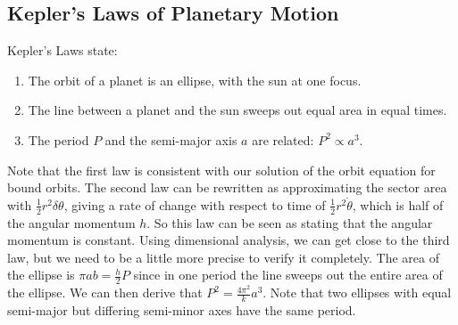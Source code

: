 \subsection{Kepler's Laws of Planetary Motion}
Kepler's Laws state:
\begin{enumerate}
	\item The orbit of a planet is an ellipse, with the sun at one focus.
	\item The line between a planet and the sun sweeps out equal area in equal times.
	\item The period $P$ and the semi-major axis $a$ are related: $P^2 \propto a^3$.
\end{enumerate}
Note that the first law is consistent with our solution of the orbit equation for bound orbits. The second law can be rewritten as approximating the sector area with $\frac{1}{2}r^2\delta\theta$, giving a rate of change with respect to time of $\frac{1}{2}r^2\dot\theta$, which is half of the angular momentum $h$. So this law can be seen as stating that the angular momentum is constant. Using dimensional analysis, we can get close to the third law, but we need to be a little more precise to verify it completely. The area of the ellipse is $\pi a b = \frac{h}{2}P$ since in one period the line sweeps out the entire area of the ellipse. We can then derive that $P^2 = \frac{4\pi^2}{k}a^3$. Note that two ellipses with equal semi-major but differing semi-minor axes have the same period.

